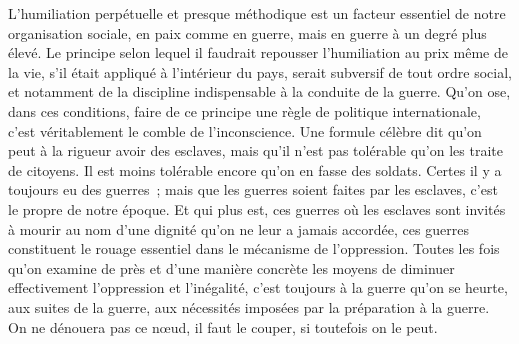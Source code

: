 \documentclass[french,twoside]{book} %
\begin{document}
L'humiliation perpétuelle et presque méthodique est un facteur essentiel de notre organisation sociale, en paix comme en guerre, mais en guerre à un degré plus élevé. Le principe selon lequel il faudrait repousser l'humiliation au prix même de la vie, s'il était appliqué à l'intérieur du pays, serait subversif de tout ordre social, et notamment de la discipline indispensable à la conduite de la guerre. Qu'on ose, dans ces conditions, faire de ce principe une règle de politique internationale, c'est véritablement le comble de l'inconscience. Une formule célèbre dit qu'on peut à la rigueur avoir des esclaves, mais qu'il n'est pas tolérable qu'on les traite de citoyens. Il est moins tolérable encore qu'on en fasse des soldats. Certes il y a toujours eu des guerres ; mais que les guerres soient faites par les esclaves, c'est le propre de notre époque. Et qui plus est, ces guerres où les esclaves sont invités à mourir au nom d'une dignité qu'on ne leur a jamais accordée, ces guerres constituent le rouage essentiel dans le mécanisme de l'oppression. Toutes les fois qu'on examine de près et d'une manière concrète les moyens de diminuer effectivement l'oppression et l'iné­galité, c'est toujours à la guerre qu'on se heurte, aux suites de la guerre, aux nécessités imposées par la préparation à la guerre. On ne dénouera pas ce nœud, il faut le couper, si toutefois on le peut.\par
\end{document}

